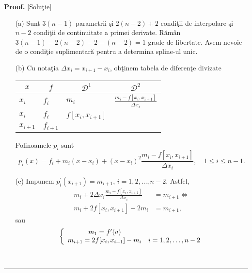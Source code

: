 \documentclass{article}%
\newenvironment{proof}[1][Proof]{\noindent\textbf{#1.} }{\ \rule{0.5em}{0.5em}}
\begin{document}
\begin{proof}
[Solu\c{t}ie]

\begin{enumerate}
\item[(a)] Sunt $3(n-1)$ parametrii \c{s}i $2(n-2)+2$ condi\c{t}ii de
interpolare \c{s}i $n-2$ condi\c{t}ii de continuitate a primei derivate.
R\u{a}m\^{a}n $3(n-1)-2(n-2)-2-(n-2)=1$ grade de libertate. Avem nevoie de o
condi\c{t}ie suplimentar\u{a} pentru a determina spline-ul unic.

\item[(b)] Cu nota\c{t}ia $\Delta x_{i}=x_{i+1}-x_{i}$, ob\c{t}inem tabela de diferen\c{t}e divizate 

\begin{tabular}
[c]{cccc}%
$x$ & $f$ & $\mathcal{D}^{1}$ & $\mathcal{D}^{2}$\\\hline
\multicolumn{1}{l}{$x_{i}$} & \multicolumn{1}{l}{$f_{i}$} &
\multicolumn{1}{l}{$m_{i}$} & \multicolumn{1}{l}{$\frac{m_{i}-f[x_{i}%
,x_{i+1}]}{\Delta x_{i}}$}\\
\multicolumn{1}{l}{$x_{i}$} & \multicolumn{1}{l}{$f_{i}$} &
\multicolumn{1}{l}{$f[x_{i},x_{i+1}]$} & \multicolumn{1}{l}{}\\
\multicolumn{1}{l}{$x_{i+1}$} & \multicolumn{1}{l}{$f_{i+1}$} &
\multicolumn{1}{l}{} & \multicolumn{1}{l}{}%
\end{tabular}
\newline Polinoamele $p_{i}$ sunt%
\[
p_{i}(x)=f_{i}+m_{i}(x-x_{i})+(x-x_{i})^{2}\frac{m_{i}-f[x_{i},x_{i+1}%
]}{\Delta x_{i}},\quad1\leq i\leq n-1.
\]


\item[(c)] Impunem $p_{i}^{\prime}(x_{i+1})=m_{i+1}$, $i=1,2,\dots,n-2$.
Astfel,
\begin{align*}
m_{i}+2\Delta x_{i}\frac{m_{i}-f[x_{i},x_{i+1}]}{\Delta x_{i}}  &
=m_{i+1}\Longleftrightarrow\\
m_{i}+2f[x_{i},x_{i+1}]-2m_{i}  &  =m_{i+1},
\end{align*}
sau%
\[
\left\{
\begin{array}
[c]{cc}%
m_{1}=f^{\prime}(a) & \\
m_{i+1}=2f[x_{i},x_{i+1}]-m_{i} & i=1,2,\dots,n-2
\end{array}
\right.
\]

\end{enumerate}
\end{proof}
\end{document}
